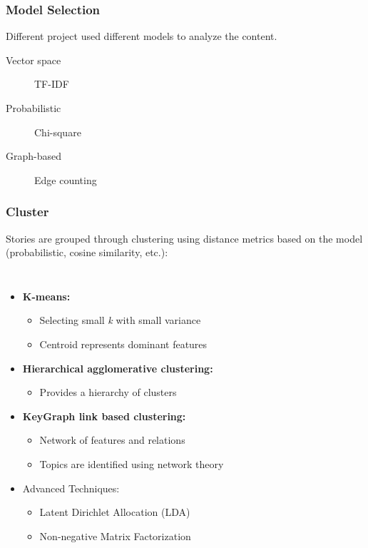 \documentclass{beamer}
\begin{document}
\begin{frame}
	\frametitle{Model Selection}
	Different project used different models to analyze the content.
	\begin{description}
		\item[Vector space] TF-IDF %
		\item[Probabilistic] Chi-square %
		\item[Graph-based] Edge counting %
	\end{description}
\end{frame}
\begin{frame}
	\frametitle{Cluster}
	Stories are grouped through clustering using distance metrics based on the
	model (probabilistic, cosine similarity, etc.):
	\begin{columns}[c]
		\column{3in}
		\begin{itemize}
			\item {\bf K-means:}
				\begin{itemize}
					\item Selecting small \emph{k} with small variance
					\item Centroid represents dominant features
				\end{itemize}
			\item {\bf Hierarchical agglomerative clustering:}
				\begin{itemize}
					\item Provides a hierarchy of clusters 
				\end{itemize}
			\item {\bf KeyGraph link based clustering:}
				\begin{itemize}
					\item Network of features and relations
					\item Topics are identified using network theory
				\end{itemize}
			\item {Advanced Techniques:}
				\begin{itemize}
					\item Latent Dirichlet Allocation (LDA)
					\item Non-negative Matrix Factorization
				\end{itemize}
		\end{itemize}
		\column{1in}

\end{columns}
\end{frame}
\end{document}
